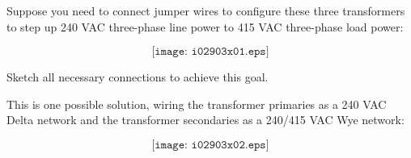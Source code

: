 

Suppose you need to connect jumper wires to configure these three transformers to step up 240 VAC three-phase line power to 415 VAC three-phase load power:

$$\texttt{[image: i02903x01.eps]}$$

Sketch all necessary connections to achieve this goal.







This is one possible solution, wiring the transformer primaries as a 240 VAC Delta network and the transformer secondaries as a 240/415 VAC Wye network:

$$\texttt{[image: i02903x02.eps]}$$











